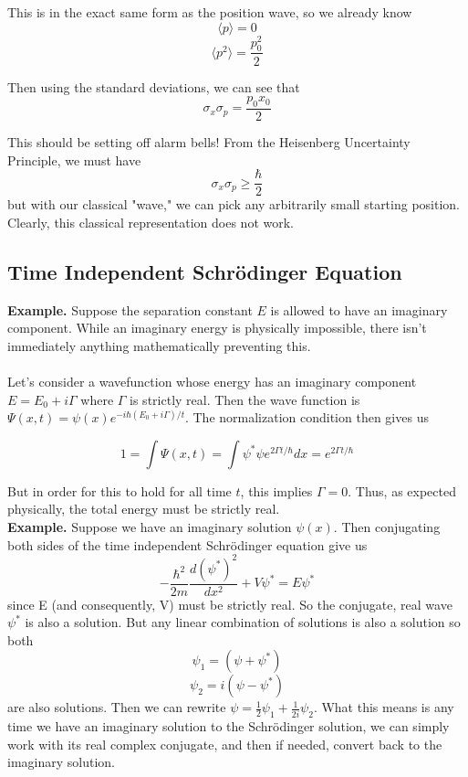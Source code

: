 \documentclass[11pt]{article}
\begin{document}
\noindent This is in the exact same form as the position wave, so we already know 
\[
    \langle p \rangle = 0
\]
\[
    \langle p^2 \rangle = \frac{p_0^2}{2}
\]

\noindent Then using the standard deviations, we can see that 
\[
    \sigma_x \sigma_p = \frac{p_0x_0}{2}
\]

\noindent This should be setting off alarm bells! From the Heisenberg Uncertainty Principle, we must have
\[
    \sigma_x \sigma_p \geq \frac{\hbar}{2}
\]
but with our classical "wave," we can pick any arbitrarily small starting position. Clearly, this classical representation does not work. 

\subsection{Time Independent Schr\"odinger Equation}
\textbf{Example.} Suppose the separation constant \(E\) is allowed to have an imaginary component. While an imaginary energy is physically
impossible, there isn't immediately anything mathematically preventing this. 
\\
\\
Let's consider a wavefunction whose energy has an imaginary 
component \(E = E_0 + i\Gamma\) where \(\Gamma\) is strictly real. Then the wave function is \(\Psi(x,t) = \psi(x)e^{-i\hbar(E_0 + i\Gamma)/t}\).
The normalization condition then gives us

\[
    1 = \int \Psi(x,t) = \int \psi^*\psi e^{2\Gamma t / \hbar} dx = e^{2\Gamma t / \hbar}
\]

\noindent But in order for this to hold for all time \(t\), this implies \(\Gamma = 0\). Thus, as expected physically, the total energy must be 
strictly real.
\\

\noindent \textbf{Example.} Suppose we have an imaginary solution \(\psi(x)\). Then conjugating both sides of the time independent Schr\"odinger equation give us 
\[
    -\frac{\hbar^2}{2m}\frac{d(\psi^{*})^2}{dx^2} + V\psi^* = E\psi^*
\]
since E (and consequently, V) must be strictly real. So the conjugate, real wave  \(\psi^*\)  is also a solution. But any linear combination of solutions
is also a solution so both 
\[
  \psi_1 = (\psi + \psi^*)  
\]
\[
    \psi_2 = i(\psi - \psi^*)
\]
are also solutions. Then we can rewrite \(\psi = \frac{1}{2}\psi_1 + \frac{1}{2i}\psi_2\). What this means is any time we have an imaginary solution to the 
Schr\"odinger solution, we can simply work with its real complex conjugate, and then if needed, convert back to the imaginary solution.
\\
\end{document}
